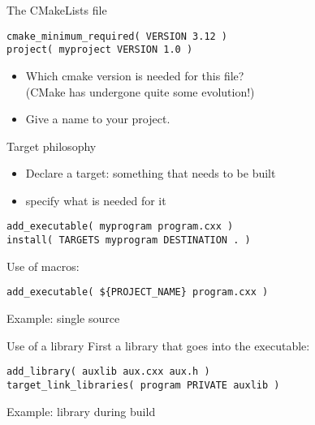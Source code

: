 
\lstset{language=CMake}
\lstset{style=greencode}

\begin{numberedframe}{The CMakeLists file}
\begin{lstlisting}
cmake_minimum_required( VERSION 3.12 )
project( myproject VERSION 1.0 )
\end{lstlisting}
  \begin{itemize}
  \item Which cmake version is needed for this file?\\
    (CMake has undergone quite some evolution!)
  \item Give a name to your project.
  \end{itemize}
\end{numberedframe}

\begin{numberedframe}{Target philosophy}
  \begin{itemize}
  \item Declare a target: something that needs to be built
  \item specify what is needed for it
  \end{itemize}
\begin{lstlisting}
add_executable( myprogram program.cxx )
install( TARGETS myprogram DESTINATION . )
\end{lstlisting}
Use of macros:
\begin{lstlisting}
add_executable( ${PROJECT_NAME} program.cxx )
\end{lstlisting}
\end{numberedframe}

\begin{numberedframe}{Example: single source}
  
\end{numberedframe}

\begin{numberedframe}{Use of a library}
First a library that goes into the executable:
\begin{lstlisting}
add_library( auxlib aux.cxx aux.h )
target_link_libraries( program PRIVATE auxlib )
\end{lstlisting}
\end{numberedframe}

\begin{numberedframe}{Example: library during build}
  \lstset{numbers=left,numberstyle=\tiny}
    
\end{numberedframe}

